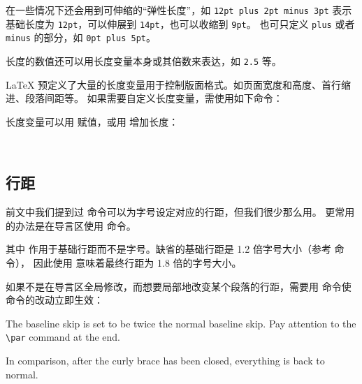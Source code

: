 在一些情况下还会用到可伸缩的“弹性长度”，如 \texttt{12pt plus 2pt minus 3pt}
表示基础长度为 \texttt{12pt}，可以伸展到 \texttt{14pt}，也可以收缩到 \texttt{9pt}。
也可只定义 \texttt{plus} 或者 \texttt{minus} 的部分，如 \texttt{0pt plus 5pt}。

长度的数值还可以用长度变量本身或其倍数来表达，如 \texttt{2.5} 等。

\LaTeX{} 预定义了大量的长度变量用于控制版面格式。如页面宽度和高度、首行缩进、段落间距等。
如果需要自定义长度变量，需使用如下命令：
\begin{command}
\end{command}

长度变量可以用  赋值，或用  增加长度：
\begin{command}
 \\
\end{command}

\subsection{行距}\label{subsec:linespread}

前文中我们提到过  命令可以为字号设定对应的行距，但我们很少那么用。
更常用的办法是在导言区使用  命令。
\begin{command}
\end{command}

其中  作用于基础行距而不是字号。缺省的基础行距是 1.2 倍字号大小（参考  命令），
因此使用  意味着最终行距为 1.8 倍的字号大小。

如果不是在导言区全局修改，而想要局部地改变某个段落的行距，需要用  命令使  命令的改动立即生效：
\begin{example}
{\linespread{2.0}\selectfont
The baseline skip is set to be
twice the normal baseline skip.
Pay attention to the \verb|\par|
command at the end. \par}

In comparison, after the
curly brace has been closed,
everything is back to normal.
\end{example}

